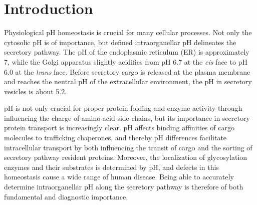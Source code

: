 \clearpage

\section{Introduction}

Physiological pH homeostasis is crucial for many cellular processes. Not only the cytosolic pH is of importance, but defined intraorganellar pH delineates the secretory pathway. The pH of the endoplasmic reticulum (ER) is approximately 7, while the Golgi apparatus slightly acidifies from pH 6.7 at the \emph{cis} face to pH 6.0 at the \emph{trans} face\cite{casey_sensors_2010,paroutis_ph_2004,schapiro_determinants_2000}. Before secretory cargo is released at the plasma membrane and reaches the neutral pH of the extracellular environment, the pH in secretory vesicles is about 5.2\cite{casey_sensors_2010,paroutis_ph_2004}.

pH is not only crucial for proper protein folding and enzyme activity through influencing the charge of amino acid side chains, but its importance in secretory protein transport is increasingly clear\cite{linders_sugary_2020}. pH affects binding affinities of cargo molecules to trafficking chaperones, and thereby pH differences facilitate intracellular transport by both influencing the transit of cargo\cite{appenzeller-herzog_ph-induced_2004,vavassori_ph-regulated_2013,sannino_progressive_2014,watanabe_structural_2017,caplan_dependence_1987,kokkonen_defective_2004,kamiya_molecular_2008} and the sorting of secretory pathway resident proteins\cite{brauer_structural_2019,wilson_ph-dependent_1993,shibuya_erv41erv46_2015}. Moreover, the localization of glycosylation enzymes and their substrates is determined by pH\cite{linders_sugary_2020,rivinoja_elevated_2009,hassinen_functional_2011,hassinen_organizational_2014,kellokumpu_golgi_2019}, and defects in this homeostasis cause a wide range of human disease\cite{linders_sugary_2020,kornak_impaired_2008,morava_defective_2005,jansen_atp6ap1_2016,rujano_mutations_2017,cannata_serio_mutations_2020,jansen_ccdc115_2016,jansen_tmem199_2016}. Being able to accurately determine intraorganellar pH along the secretory pathway is therefore of both fundamental and diagnostic importance.

